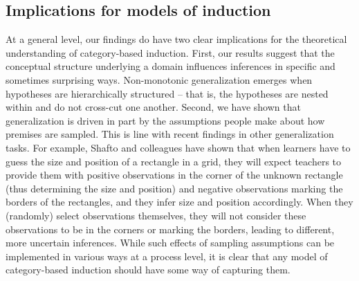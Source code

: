 \documentclass[authoryear,11pt]{elsarticle}
\begin{document}
\subsection{Implications for models of induction}

At a general level, our findings do have two clear implications for the theoretical understanding of category-based induction. First, our results suggest that the conceptual structure underlying a domain influences inferences in specific and sometimes surprising ways. Non-monotonic generalization emerges when hypotheses are hierarchically structured -- that is, the hypotheses are nested within and do not cross-cut one another. Second, we have shown that generalization is driven in part by the assumptions people make about how premises are  sampled. This is line with recent findings in other generalization tasks. For example, Shafto and colleagues \citep{ShaftoGoodman2008, Shaftoetal2014} have shown that when learners have to guess the size and position of a rectangle in a grid, they will expect teachers to provide them with positive observations in the corner of the unknown rectangle (thus determining the size and position) and negative observations marking the borders of the rectangles, and they infer size and position accordingly. When they (randomly) select observations themselves, they will not consider these observations to be in the corners or marking the borders, leading to different, more uncertain inferences. While such effects of sampling assumptions can be implemented in various ways at a process level, it is clear that any model of category-based induction should have some way of capturing them.
\end{document}
